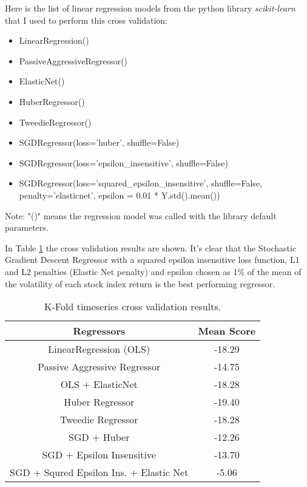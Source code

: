 Here is the list of linear regression models from the python library \textit{scikit-learn} that I used to perform this cross validation:
\begin{itemize}
	\item LinearRegression()
	\item PassiveAggressiveRegressor()
	\item ElasticNet()
	\item HuberRegressor()
	\item TweedieRegressor()
	\item SGDRegressor(loss='huber', shuffle=False)
	\item SGDRegressor(loss='epsilon\_insensitive', shuffle=False)
	\item SGDRegressor(loss='squared\_epsilon\_insensitive', shuffle=False, penalty='elasticnet', epsilon = 0.01 * Y.std().mean())
\end{itemize}
Note: "()" means the regression model was called with the library default parameters.


In Table \ref{tab:crossval-results} the cross validation results are shown. It's clear that the Stochastic Gradient Descent Regressor with a squared epsilon insensitive loss function, L1 and L2 penalties (Elastic Net penalty) and epsilon chosen as 1\% of the mean of the volatility of each stock index return is the best performing regressor.

\begin{table}[]
	\centering
	\begin{tabular}{|c|c|}
		\hline
		\textbf{Regressors}                     & \textbf{Mean Score} \\ \hline
		LinearRegression (OLS)                  & -18.29              \\ \hline
		Passive Aggressive Regressor            & -14.75              \\ \hline
		OLS + ElasticNet                        & -18.28              \\ \hline
		Huber Regressor                         & -19.40              \\ \hline
		Tweedie Regressor                       & -18.28              \\ \hline
		SGD + Huber                             & -12.26              \\ \hline
		SGD + Epsilon Insensitive               & -13.70              \\ \hline
		SGD + Squred Epsilon Ins. + Elastic Net & -5.06               \\ \hline
	\end{tabular}
	\caption{K-Fold timeseries cross validation results.}
	\label{tab:crossval-results}
\end{table}


